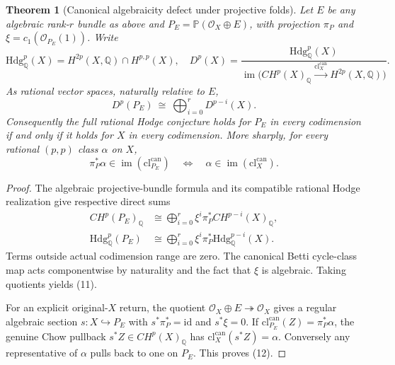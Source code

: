 \documentclass[11pt]{article}
\newtheorem{theorem}{Theorem}
\begin{document}
\begin{theorem}[Canonical algebraicity defect under projective folds]
Let $E$ be any algebraic rank-$r$ bundle as above and
$P_E=\mathbb P(\mathcal O_X\oplus E)$, with projection $\pi_P$
and $\xi=c_1(\mathcal O_{P_E}(1))$. Write
\[
 \mathrm{Hdg}^p_{\mathbb Q}(X)
   =H^{2p}(X,\mathbb Q)\cap H^{p,p}(X),\quad
 D^p(X)=
  \frac{\mathrm{Hdg}^p_{\mathbb Q}(X)}
       {\operatorname{im}\bigl(
             CH^p(X)_{\mathbb Q}
          \xrightarrow{\mathrm{cl}_X^{\mathrm{can}}}
             H^{2p}(X,\mathbb Q)\bigr)}.
\]
As rational vector spaces, naturally relative to $E$,
\[
 \boxed{D^p(P_E)\ \cong\
   \bigoplus_{i=0}^{r}D^{p-i}(X).}                          \tag{11}
\]
Consequently the full rational Hodge conjecture holds for $P_E$
in every codimension if and only if it holds for $X$ in every
codimension. More sharply, for every rational $(p,p)$ class
$\alpha$ on $X$,
\[
  \pi_P^*\alpha\in\operatorname{im}(\mathrm{cl}^{\mathrm{can}}_{P_E})
  \quad\Longleftrightarrow\quad
  \alpha\in\operatorname{im}(\mathrm{cl}^{\mathrm{can}}_X).
                                                                  \tag{12}
\]
\end{theorem}
\begin{proof}
The algebraic projective-bundle formula and its compatible
rational Hodge realization give respective direct sums
\[
 \begin{aligned}
 CH^p(P_E)_{\mathbb Q}
   &\cong\bigoplus_{i=0}^{r}
      \xi^i\pi_P^* CH^{p-i}(X)_{\mathbb Q},\\
 \mathrm{Hdg}^p_{\mathbb Q}(P_E)
   &\cong\bigoplus_{i=0}^{r}
      \xi^i\pi_P^*\mathrm{Hdg}^{p-i}_{\mathbb Q}(X).
 \end{aligned}
\]
Terms outside actual codimension range are zero. The canonical
Betti cycle-class map acts componentwise by naturality and the
fact that $\xi$ is algebraic. Taking quotients yields (11).

For an explicit original-$X$ return, the quotient
$\mathcal O_X\oplus E\twoheadrightarrow\mathcal O_X$ gives a
regular algebraic section $s:X\hookrightarrow P_E$ with
$s^*\pi_P^*=\mathrm{id}$ and $s^*\xi=0$.
If $\mathrm{cl}^{\mathrm{can}}_{P_E}(Z)=\pi_P^*\alpha$,
the genuine Chow pullback $s^*Z\in CH^p(X)_{\mathbb Q}$ has
$\mathrm{cl}_X^{\mathrm{can}}(s^*Z)=\alpha$.
Conversely any representative of $\alpha$ pulls back to one
on $P_E$. This proves (12).
\end{proof}
\end{document}

